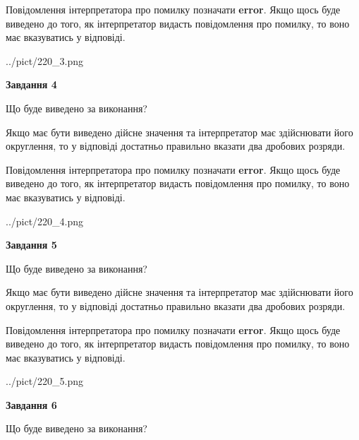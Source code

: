 \documentclass[12pt, ukrainian]{article}
\begin{document}
{\begin {Large}
Повідомлення інтерпретатора про помилку позначати \textbf{error}.
Якщо щось буде виведено до того, як інтерпретатор видасть повідомлення про помилку, 
то воно має вказуватись у відповіді. \par

\begin{center}
	{../pict/220_3.png}
\end{center}
\newpage

{\begin {center}\textbf{Завдання 4}\end {center}}\par
Що буде виведено за виконання? \par

Якщо має бути виведено дійсне значення та інтерпретатор має здійснювати його округлення, 
то у відповіді достатньо правильно вказати два дробових розряди.

Повідомлення інтерпретатора про помилку позначати \textbf{error}.
Якщо щось буде виведено до того, як інтерпретатор видасть повідомлення про помилку, 
то воно має вказуватись у відповіді. \par

\begin{center}
	{../pict/220_4.png}
\end{center}
\newpage

{\begin {center}\textbf{Завдання 5}\end {center}}\par
Що буде виведено за виконання? \par

Якщо має бути виведено дійсне значення та інтерпретатор має здійснювати його округлення, 
то у відповіді достатньо правильно вказати два дробових розряди.

Повідомлення інтерпретатора про помилку позначати \textbf{error}.
Якщо щось буде виведено до того, як інтерпретатор видасть повідомлення про помилку, 
то воно має вказуватись у відповіді. \par

\begin{center}
	{../pict/220_5.png}
\end{center}
\newpage

{\begin {center}\textbf{Завдання 6}\end {center}}\par
Що буде виведено за виконання? \par


\end{Large}}
\end{document}
